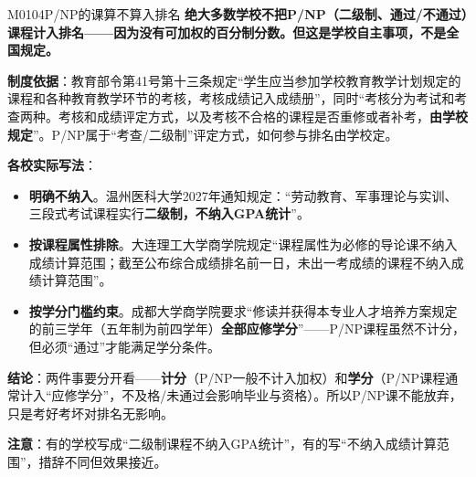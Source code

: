 \begin{qa}{M0104}{P/NP的课算不算入排名}
\textbf{绝大多数学校不把P/NP（二级制、通过/不通过）课程计入排名——因为没有可加权的百分制分数。但这是学校自主事项，不是全国规定。}

\textbf{制度依据}：教育部令第41号第十三条规定“学生应当参加学校教育教学计划规定的课程和各种教育教学环节的考核，考核成绩记入成绩册”，同时“考核分为考试和考查两种。考核和成绩评定方式，以及考核不合格的课程是否重修或者补考，\textbf{由学校规定}”。P/NP属于“考查/二级制”评定方式，如何参与排名由学校定。

\textbf{各校实际写法}：

\begin{itemize}
  \item \textbf{明确不纳入}。温州医科大学2027年通知规定：“劳动教育、军事理论与实训、三段式考试课程实行\textbf{二级制，不纳入GPA统计}”。
  \item \textbf{按课程属性排除}。大连理工大学商学院规定“课程属性为必修的导论课不纳入成绩计算范围；截至公布综合成绩排名前一日，未出一考成绩的课程不纳入成绩计算范围”。
  \item \textbf{按学分门槛约束}。成都大学商学院要求“修读并获得本专业人才培养方案规定的前三学年（五年制为前四学年）\textbf{全部应修学分}”——P/NP课程虽然不计分，但必须“通过”才能满足学分条件。
\end{itemize}

\textbf{结论}：两件事要分开看——\textbf{计分}（P/NP一般不计入加权）和\textbf{学分}（P/NP课程通常计入“应修学分”，不及格/未通过会影响毕业与资格）。所以P/NP课不能放弃，只是考好考坏对排名无影响。

\textbf{注意}：有的学校写成“二级制课程不纳入GPA统计”，有的写“不纳入成绩计算范围”，措辞不同但效果接近。
\end{qa}


